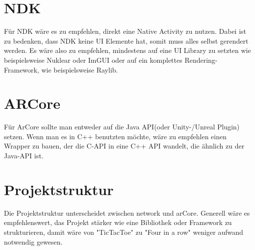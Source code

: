 \section{NDK}
Für NDK wäre es zu empfehlen, direkt eine Native Activity zu nutzen.
Dabei ist zu bedenken, dass NDK keine UI Elemente hat, somit muss alles selbst
gerendert werden. Es wäre also zu empfehlen, mindestens auf eine UI Library zu setzten
wie beispielsweise Nuklear oder ImGUI oder auf ein komplettes Rendering-Framework,
wie beispielsweise Raylib.

\section{ARCore}
Für ArCore sollte man entweder auf die Java API(oder Unity-/Unreal Plugin) setzen.
Wenn man es in C++ benutzten möchte, wäre zu empfehlen einen Wrapper zu bauen, der die
C-API in eine C++ API wandelt, die ähnlich zu der Java-API ist.

\section{Projektstruktur}
Die Projektstruktur unterscheidet zwischen network und arCore. Generell wäre es empfehlenswert, das Projekt stärker wie eine Bibliothek oder Framework zu strukturieren, damit wäre von "TicTacToe" zu "Four in a row" weniger aufwand notwendig gewesen.
